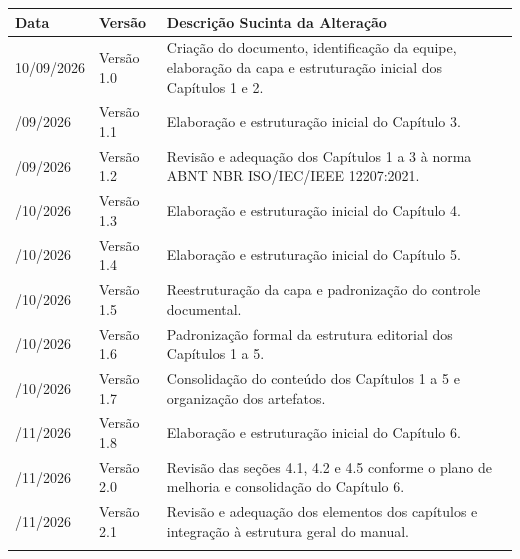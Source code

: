 \begin{tabularx}{\linewidth}{@{}>{\fontExtraBold\color{BrandNavy}\centering\arraybackslash}m{2.4cm} >{\fontSemiBold\centering\arraybackslash}m{2.4cm} Y@{}}
  \toprule
  \textbf{Data} & \textbf{Versão} & \textbf{Descrição Sucinta da Alteração} \\
  \midrule
  10/09/2026 & Versão 1.0 & Criação do documento, identificação da equipe, elaboração da capa e estruturação inicial dos Capítulos 1 e 2. \\
  /09/2026 & Versão 1.1 & Elaboração e estruturação inicial do Capítulo 3. \\
  /09/2026 & Versão 1.2 & Revisão e adequação dos Capítulos 1 a 3 à norma ABNT NBR ISO/IEC/IEEE 12207:2021. \\
  /10/2026 & Versão 1.3 & Elaboração e estruturação inicial do Capítulo 4. \\
  /10/2026 & Versão 1.4 & Elaboração e estruturação inicial do Capítulo 5. \\
  /10/2026 & Versão 1.5 & Reestruturação da capa e padronização do controle documental. \\
  /10/2026 & Versão 1.6 & Padronização formal da estrutura editorial dos Capítulos 1 a 5. \\
  /10/2026 & Versão 1.7 & Consolidação do conteúdo dos Capítulos 1 a 5 e organização dos artefatos. \\
  /11/2026 & Versão 1.8 & Elaboração e estruturação inicial do Capítulo 6. \\
  /11/2026 & Versão 2.0 & Revisão das seções 4.1, 4.2 e 4.5 conforme o plano de melhoria e consolidação do Capítulo 6. \\
  /11/2026 & Versão 2.1 & Revisão e adequação dos elementos dos capítulos e integração à estrutura geral do manual. \\
  \bottomrule
\end{tabularx}
